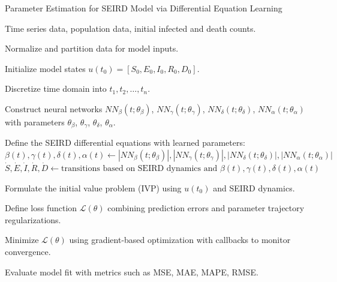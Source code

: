 \documentclass[12pt, letterpaper]{report}
\begin{document}
\begin{algorithm}
\caption{Parameter Estimation for SEIRD Model via Differential Equation Learning}
\begin{algorithmic}[1]

\Require Time series data, population data, initial infected and death counts.

\State Normalize and partition data for model inputs.

\State Initialize model states $u(t_0) = [S_0, E_0, I_0, R_0, D_0]$.

\State Discretize time domain into $t_1, t_2, \ldots, t_n$.

\State Construct neural networks $NN_{\beta}(t;\theta_{\beta})$, $NN_{\gamma}(t;\theta_{\gamma})$, $NN_{\delta}(t;\theta_{\delta})$, $NN_{\alpha}(t;\theta_{\alpha})$ with parameters $\theta_{\beta}$, $\theta_{\gamma}$, $\theta_{\delta}$, $\theta_{\alpha}$.

\State Define the SEIRD differential equations with learned parameters:
    \State $\beta(t), \gamma(t), \delta(t), \alpha(t) \gets |NN_{\beta}(t;\theta_{\beta})|, |NN_{\gamma}(t;\theta_{\gamma})|, |NN_{\delta}(t;\theta_{\delta})|, |NN_{\alpha}(t;\theta_{\alpha})|$
    \State $\dot{S}, \dot{E}, \dot{I}, \dot{R}, \dot{D} \gets \text{transitions based on SEIRD dynamics and } \beta(t), \gamma(t), \delta(t), \alpha(t)$
\EndFunction

\State Formulate the initial value problem (IVP) using $u(t_0)$ and SEIRD dynamics.

\State Define loss function $\mathcal{L}(\theta)$ combining prediction errors and parameter trajectory regularizations.

\State Minimize $\mathcal{L}(\theta)$ using gradient-based optimization with callbacks to monitor convergence.

\State Evaluate model fit with metrics such as MSE, MAE, MAPE, RMSE.

\end{algorithmic}
\end{algorithm}
\end{document}
